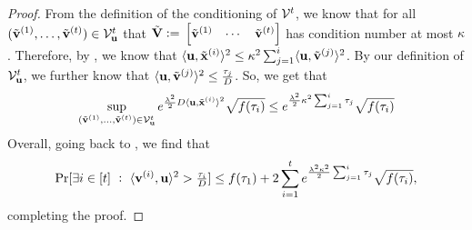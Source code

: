 \begin{proof}
From the definition of the conditioning of \({\mathcal V}^t\), we know that for all \((\tilde{\boldsymbol{\mathrm{v}}}^{(1)},\ldots,\tilde{\boldsymbol{\mathrm{v}}}^{(t)})\in{\mathcal V}_{\boldsymbol{\mathrm{u}}}^t\) that \(\tilde{\mathbf{V}} \;{\vcentcolon=}\; \begin{bmatrix} \tilde{\boldsymbol{\mathrm{v}}}^{(1)} & \cdots & \tilde{\boldsymbol{\mathrm{v}}}^{(t)} \end{bmatrix}\) has condition number at most \(\kappa\).
Therefore, by , we know that \(\langle \boldsymbol{\mathrm{u}}, \tilde{\boldsymbol{\mathrm{x}}}^{(i)} \rangle^2 \leq \kappa^2 \sum_{j=1}^i \langle \boldsymbol{\mathrm{u}},\tilde{\boldsymbol{\mathrm{v}}}^{(j)}\rangle^2\).
By our definition of \({\mathcal V}_{\boldsymbol{\mathrm{u}}}^t\), we further know that \(\langle \boldsymbol{\mathrm{u}},\tilde{\boldsymbol{\mathrm{v}}}^{(j)}\rangle^2 \leq \frac{\tau_j}{D}\).
So, we get that
\[
    \sup_{(\tilde{\boldsymbol{\mathrm{v}}}^{(1)},\ldots,\tilde{\boldsymbol{\mathrm{v}}}^{(t)})\in{\mathcal V}^t_{\boldsymbol{\mathrm{u}}}}
    e^{\frac{\lambda^2}{2} D\langle \boldsymbol{\mathrm{u}},\tilde{\boldsymbol{\mathrm{x}}}^{(i)}\rangle^2}
    \sqrt{f(\tau_i)}
    \leq
    e^{\frac{\lambda^2}{2} \kappa^2 \sum_{j=1}^i \tau_j}
    \sqrt{f(\tau_i)}
\]
Overall, going back to , we find that
\[
     \Pr[\exists i \in [t] ~:~ \langle \boldsymbol{\mathrm{v}}^{(i)}, \boldsymbol{\mathrm{u}}\rangle^2 > {{\textstyle\frac{\tau_i}{D}}}]
    \leq
    f(\tau_1) + 2\sum_{i=1}^t
    e^{\frac{\lambda^2\kappa^2}{2} \sum_{j=1}^i \tau_j}\sqrt{f(\tau_i)},
\]
completing the proof.
\end{proof}

